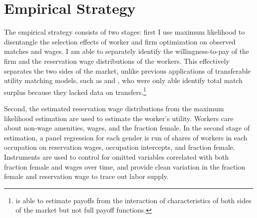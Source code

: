 \documentclass[11pt]{article}
\begin{document}


\section{Empirical Strategy} \label{empirical}
The empirical strategy consists of two stages: first I use maximum likelihood to disentangle the selection effects of worker and firm optimization on observed matches and wages. I am able to separately identify the willingness-to-pay of the firm and the reservation wage distributions of the workers. This effectively separates the two sides of the market, unlike previous applications of transferable utility matching models, such as  and , who were only able identify total match surplus because they lacked data on transfers.\footnote{ is able to estimate payoffs from the interaction of characteristics of both sides of the market but not full payoff functions.}

Second, the estimated reservation wage distributions from the maximum likelihood estimation are used to estimate the worker's utility. Workers care about non-wage amenities, wages, and the fraction female. In the second stage of estimation, a panel regression for each gender is run of shares of workers in each occupation on reservation wages, occupation intercepts, and fraction female. Instruments are used to control for omitted variables correlated with both fraction female and wages over time, and provide clean variation in the fraction female and reservation wage to trace out labor supply.


\end{document}
